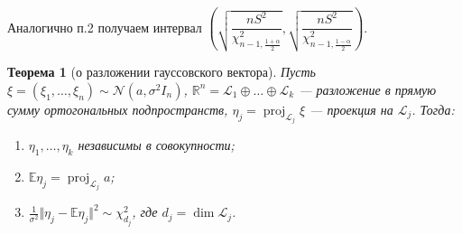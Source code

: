 \documentclass[12pt]{report}
\newtheorem{theorem}{Теорема}
\theoremstyle{definition}
\begin{document}
Аналогично п.2 получаем интервал $\left(\sqrt{\dfrac{nS^2}{\chi^2_{n-1, \frac{1+\alpha}{2}}}}, \sqrt{\dfrac{nS^2}{\chi^2_{n-1, \frac{1-\alpha}{2}}}}\right)$.

\begin{theorem}[о разложении гауссовского вектора]
	Пусть $\xi = (\xi_1, \dots, \xi_n) \sim \mathcal{N} (a, \sigma^2 I_n)$,  $\mathbb{R}^n = \mathcal{L}_1 \oplus \dots \oplus \mathcal{L}_k$ — разложение в прямую сумму ортогональных подпространств, $\eta_j = \operatorname{proj}_{\mathcal{L}_j} \xi$ — проекция на $\mathcal{L}_j$. Тогда:
	\begin{enumerate}
		\item $\eta_1, \dots, \eta_k$ независимы в совокупности;
		\item $\mathbb{E}\eta_j = \operatorname{proj}_{\mathcal{L}_j} a$;
		\item $\frac{1}{\sigma^2}\Vert \eta_j - \mathbb{E}\eta_j \Vert^2 \sim \chi^2_{d_j}$, где $d_j = \dim \mathcal{L}_j$.
	\end{enumerate}
\end{theorem}
\end{document}
